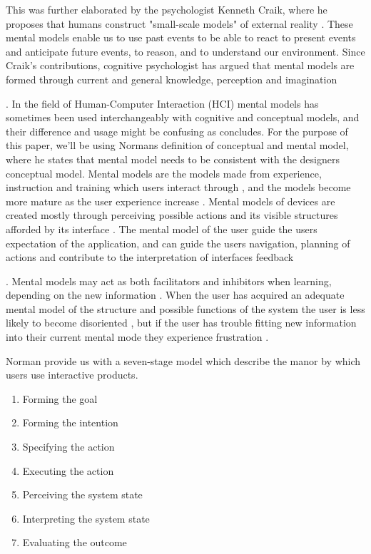 This was further elaborated by the psychologist Kenneth Craik, where he proposes that humans construct "small-scale models" of external reality \cite{Craik1967}. These mental models enable us to use past events to be able to react to present events and anticipate future events, to reason, and to understand our environment. Since Craik's contributions, cognitive psychologist has argued that mental models are formed through current and general knowledge, perception and imagination \cite{Johnson-Laird2001} . In the field of Human-Computer Interaction (HCI) mental models has sometimes been used interchangeably with cognitive and conceptual models, and their difference and usage might be confusing as \cite{Staggers1993} concludes. For the purpose of this paper, we'll be using Normans \cite{Norman2013a} definition of conceptual and mental model, where he states that mental model needs to be consistent with the designers conceptual model. Mental models are the models made from experience, instruction and training which users interact through \cite{Norman2013a}, and the models become more mature as the user experience increase \cite{Barker1998}. Mental models of devices are created mostly through perceiving possible actions and its visible structures afforded by its interface \cite{Norman2013a}. The mental model of the user guide the users expectation of the application, and can guide the users navigation, planning of actions and contribute to the interpretation of interfaces feedback \cite{Jin1992}. Mental models may act as both facilitators and inhibitors when learning, depending on the new information \cite{Cho1996}. When the user has acquired an adequate mental model of the structure and possible functions of the system the user is less likely to become disoriented \cite{Jih1992}, but if the user has trouble fitting new information into their current mental mode they experience frustration \cite{DApollonia2004}.

Norman \cite{Norman2013a} provide us with a seven-stage model which describe the manor by which users use interactive products.
\begin{enumerate}
  \item Forming the goal
  \item Forming the intention
  \item Specifying the action
  \item Executing the action
  \item Perceiving the system state
  \item Interpreting the system state
  \item Evaluating the outcome
\end{enumerate}

